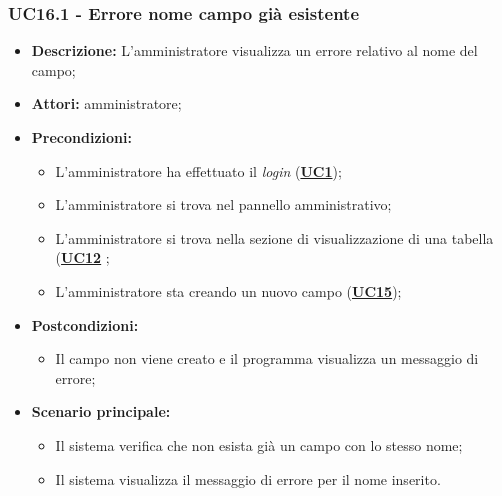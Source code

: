 \subsubsection{UC16.1 - Errore nome campo già esistente}
\label{sec:UC16.1}
\begin{itemize}
	\item \textbf{Descrizione:} L’amministratore visualizza un errore relativo al nome del campo;
	\item \textbf{Attori:} amministratore;
	\item \textbf{Precondizioni:} 
	\begin{itemize}
		\item L’amministratore ha effettuato il \textit{login} (\hyperref[sec:UC1]{\textbf{UC1}});
		\item L’amministratore si trova nel pannello amministrativo;
		\item L’amministratore si trova nella sezione di visualizzazione di una tabella (\hyperref[sec:UC12]{\textbf{UC12}} ;
		\item L’amministratore sta creando un nuovo campo (\hyperref[sec:UC15]{\textbf{UC15}});
	\end{itemize}
	\item \textbf{Postcondizioni:} 
	\begin{itemize}
		\item Il campo non viene creato e il programma visualizza un messaggio di errore;
	\end{itemize}
	\item \textbf{Scenario principale:} 
	\begin{itemize}
		\item Il sistema verifica che non esista già un campo con lo stesso nome;
		\item Il sistema visualizza il messaggio di errore per il nome inserito.
	\end{itemize}
\end{itemize}


